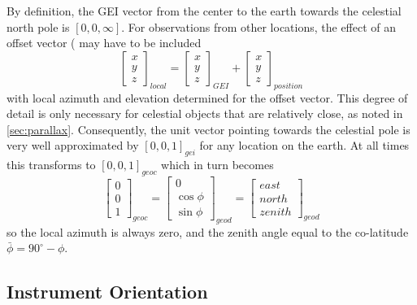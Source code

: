 \documentclass[11pt,twoside]{article}   %
\begin{document}
By definition, the GEI vector from the center to the earth towards
the celestial north pole is $[0,0,\infty]$.  For observations from
other locations, the effect of an offset vector ( may have to be
included
 \begin{equation}
  \left [ \begin{array}{c}
   x \\ y \\ z
   \end{array} \right ]_{local}
 =
  \left [ \begin{array}{c}
   x \\ y \\ z
   \end{array} \right ]_{GEI}
   +
   \left [ \begin{array}{c}
   x \\ y \\ z
   \end{array} \right ]_{position}
 \end{equation}
with local azimuth and elevation determined for the offset vector.
This degree of detail is only necessary for celestial objects that
are relatively close, as noted in \ref{sec:parallax}.
Consequently, the unit vector pointing towards the celestial pole
is very well approximated by $[0,0,1]_{gei}$ for any location on
the earth.  At all times this transforms to $[0,0,1]_{geoc}$ which
in turn becomes
 \begin{equation}
  \left [ \begin{array}{c}
   0 \\ 0 \\ 1
   \end{array} \right ]_{geoc}
 =
  \left [ \begin{array}{c}
   0 \\ \cos\phi \\ \sin\phi
   \end{array} \right ]_{geod}
 =
  \left [ \begin{array}{c}
   east \\ north \\ zenith
   \end{array} \right ]_{geod}
 \end{equation}
so the local azimuth is always zero, and the zenith angle equal to
the co-latitude $\bar\phi = 90^\circ - \phi$.

 \subsection{Instrument Orientation}
  \label{ssec:cameraorientation}
\end{document}
